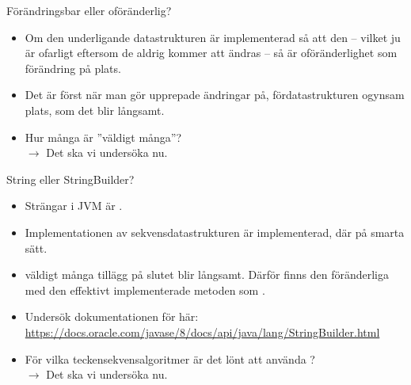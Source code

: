 

\ifkompendium\else


\begin{Slide}{Förändringsbar eller oföränderlig?}
\begin{itemize}
\item Om den underligande  datastrukturen är  implementerad så att den  -- vilket ju är ofarligt eftersom de aldrig kommer att ändras -- så är oföränderlighet  som förändring på plats.

\item Det är först när man gör  upprepade ändringar på, fördatastrukturen ogynsam plats, som det blir långsamt. 

\item Hur många är ''väldigt många''?  \\ \pause $\rightarrow$ Det ska vi undersöka nu.

\end{itemize}
\end{Slide}

\begin{Slide}{String eller StringBuilder?}
\begin{itemize}
\item Strängar i JVM är . 

\item Implementationen av sekvensdatastrukturen  är  implementerad, där  på smarta sätt.

\item {} väldigt många tillägg på slutet blir långsamt. Därför finns den föränderliga  med den effektivt implementerade metoden  som .

\pause
\item Undersök dokumentationen för  här:
{\SlideFontTiny\url{https://docs.oracle.com/javase/8/docs/api/java/lang/StringBuilder.html}}

\pause
\item För vilka teckensekvensalgoritmer är det lönt att använda ? \\
\pause $\rightarrow$ Det ska vi undersöka nu.

\end{itemize}
\end{Slide}

